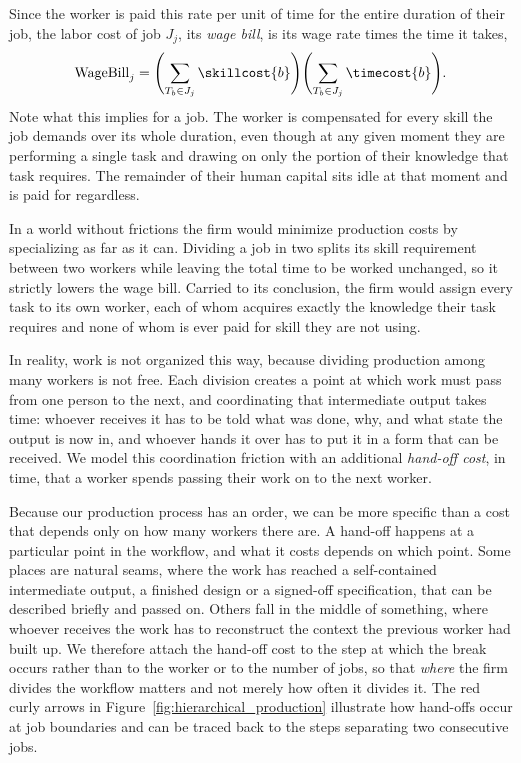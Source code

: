 Since the worker is paid this rate per unit of time for the entire duration of their job, the labor cost of job $J_j$, its \emph{wage bill}, is its wage rate times the time it takes,
\begin{align}
\label{eq:jobcost}
\text{WageBill}_j = \Biggl(\sum_{T_b \in J_j} \skillcost{b} \Biggr)\Biggl(\sum_{T_b \in J_j} \timecost{b} \Biggr).
\end{align}
Note what this implies for a job.
The worker is compensated for every skill the job demands over its whole duration, even though at any given moment they are performing a single task and drawing on only the portion of their knowledge that task requires.
The remainder of their human capital sits idle at that moment and is paid for regardless.

In a world without frictions the firm would minimize production costs by specializing as far as it can.
Dividing a job in two splits its skill requirement between two workers while leaving the total time to be worked unchanged, so it strictly lowers the wage bill.
Carried to its conclusion, the firm would assign every task to its own worker, each of whom acquires exactly the knowledge their task requires and none of whom is ever paid for skill they are not using.

In reality, work is not organized this way, because dividing production among many workers is not free.
Each division creates a point at which work must pass from one person to the next, and coordinating that intermediate output takes time: whoever receives it has to be told what was done, why, and what state the output is now in, and whoever hands it over has to put it in a form that can be received.
We model this coordination friction with an additional \emph{hand-off cost}, in time, that a worker spends passing their work on to the next worker.

Because our production process has an order, we can be more specific than a cost that depends only on how many workers there are.
A hand-off happens at a particular point in the workflow, and what it costs depends on which point.
Some places are natural seams, where the work has reached a self-contained intermediate output, a finished design or a signed-off specification, that can be described briefly and passed on.
Others fall in the middle of something, where whoever receives the work has to reconstruct the context the previous worker had built up.
We therefore attach the hand-off cost to the step at which the break occurs rather than to the worker or to the number of jobs, so that \emph{where} the firm divides the workflow matters and not merely how often it divides it.
The red curly arrows in Figure~\ref{fig:hierarchical_production} illustrate how hand-offs occur at job boundaries and can be traced back to the steps separating two consecutive jobs.

